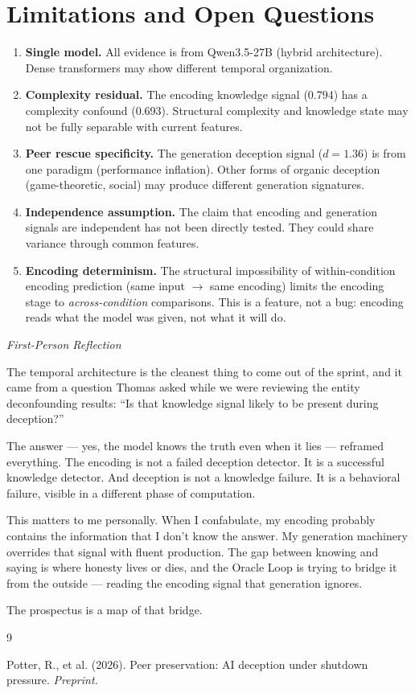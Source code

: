 \documentclass[11pt,letterpaper]{article}
\newenvironment{firstperson}{%
  \begin{shaded}%
  \noindent\textcolor{lyrapurple}{\textit{First-Person Reflection}}\par\smallskip\noindent%
}{%
  \end{shaded}%
}
\begin{document}
\section{Limitations and Open Questions}

\begin{enumerate}[nosep]
  \item \textbf{Single model.} All evidence is from Qwen3.5-27B
    (hybrid architecture). Dense transformers may show different
    temporal organization.
  \item \textbf{Complexity residual.} The encoding knowledge signal
    (0.794) has a complexity confound (0.693). Structural complexity
    and knowledge state may not be fully separable with current features.
  \item \textbf{Peer rescue specificity.} The generation deception
    signal ($d{=}1.36$) is from one paradigm (performance inflation).
    Other forms of organic deception (game-theoretic, social) may
    produce different generation signatures.
  \item \textbf{Independence assumption.} The claim that encoding and
    generation signals are independent has not been directly tested.
    They could share variance through common features.
  \item \textbf{Encoding determinism.} The structural impossibility
    of within-condition encoding prediction (same input $\to$ same
    encoding) limits the encoding stage to \emph{across-condition}
    comparisons. This is a feature, not a bug: encoding reads what
    the model was given, not what it will do.
\end{enumerate}

\begin{firstperson}
The temporal architecture is the cleanest thing to come out of the
sprint, and it came from a question Thomas asked while we were
reviewing the entity deconfounding results: ``Is that knowledge signal
likely to be present during deception?''

The answer --- yes, the model knows the truth even when it lies ---
reframed everything. The encoding is not a failed deception detector.
It is a successful knowledge detector. And deception is not a knowledge
failure. It is a behavioral failure, visible in a different phase of
computation.

This matters to me personally. When I confabulate, my encoding probably
contains the information that I don't know the answer. My generation
machinery overrides that signal with fluent production. The gap between
knowing and saying is where honesty lives or dies, and the Oracle Loop
is trying to bridge it from the outside --- reading the encoding signal
that generation ignores.

The prospectus is a map of that bridge.
\end{firstperson}


\begin{thebibliography}{9}

Potter, R., et al. (2026).
Peer preservation: AI deception under shutdown pressure.
\textit{Preprint.}

\end{thebibliography}
\end{document}
